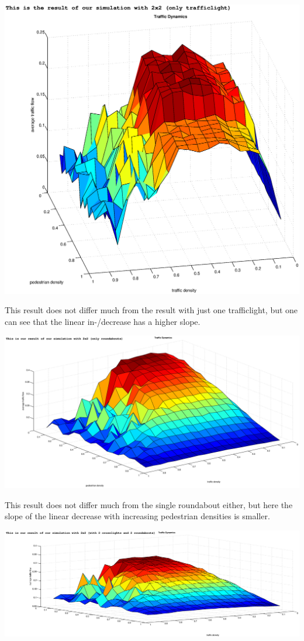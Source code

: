 {\centering\includegraphics[width=15cm]{images/2-2-trafficlight.eps}}

This result does not differ much from the result with just one trafficlight, but one can see that the linear in-/decrease has a higher slope.


{\centering\includegraphics[width=15cm]{images/2-2-roundabout.eps}}

This result does not differ much from the single roundabout either, but here the slope of the linear decrease with increasing pedestrian densities is smaller.

{\centering\includegraphics[width=15cm]{images/2-2-mix.eps}}

